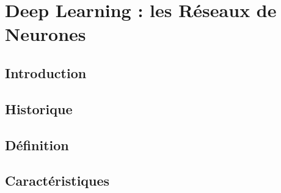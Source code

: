 \chapter{Deep Learning : les Réseaux de Neurones}


\minitoc
\thispagestyle{empty}
\newpage	
	
	\section{Introduction}
	
		
	\section{Historique}

	\section{Définition}

	\section{Caractéristiques}
	
	